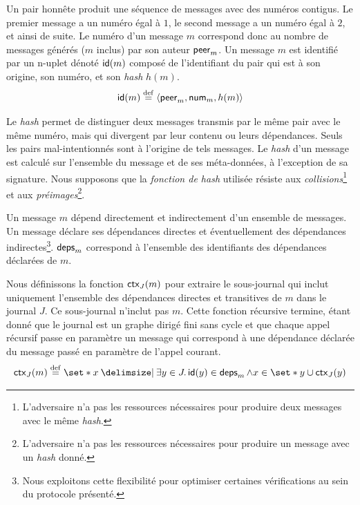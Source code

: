 Un pair honnête produit une séquence de messages avec des numéros contigus.
Le premier message a un numéro égal à $1$, le second message a un numéro égal à $2$, et ainsi de suite.
Le numéro d'un message $m$ correspond donc au nombre de messages générés ($m$ inclus) par son auteur $\trm{peer}_m$.
Un message $m$ est identifié par un n-uplet dénoté $\trm{id}(m)$ composé de l'identifiant du pair qui est à son origine, son numéro, et son \emph{hash} $h(m)$.
%
\begin{equation}
    \trm{id}(m) \defeq \tuple*{\trm{peer}_m, \trm{num}_m, h(m)}
\end{equation}

Le \emph{hash} permet de distinguer deux messages transmis par le même pair avec le même numéro, mais qui divergent par leur contenu ou leurs dépendances.
Seuls les pairs mal-intentionnés sont à l'origine de tels messages.
Le \emph{hash} d'un message est calculé sur l'ensemble du message et de ses méta-données, à l'exception de sa signature.
Nous supposons que la \emph{fonction de hash} utilisée résiste aux \emph{collisions}\footnote{L'adversaire n'a pas les ressources nécessaires pour produire deux messages avec le même \emph{hash}.} et aux \emph{préimages}\footnote{L'adversaire n'a pas les ressources nécessaires pour produire un message avec un \emph{hash} donné.}.

Un message $m$ dépend directement et indirectement d'un ensemble de messages.
Un message déclare ses dépendances directes et éventuellement des dépendances indirectes\footnote{Nous exploitons cette flexibilité pour optimiser certaines vérifications au sein du protocole présenté.}.
$\trm{deps}_m$ correspond à l'ensemble des identifiants des dépendances déclarées de $m$.

Nous définissons la fonction $\trm{ctx}_J(m)$ pour extraire le sous-journal qui inclut uniquement l'ensemble des dépendances directes et transitives de $m$ dans le journal $J$.
Ce sous-journal n'inclut pas $m$.
Cette fonction récursive termine, étant donné que le journal est un graphe dirigé fini sans cycle et que chaque appel récursif passe en paramètre un message qui correspond à une dépendance déclarée du message passé en paramètre de l'appel courant.
%
\begin{equation}
    \trm{ctx}_J(m) \defeq \set*{ x \given \exists y \in J \qsep \trm{id}(y) \in \trm{deps}_m \land x \in \set*{y} \cup \trm{ctx}_J(y)}
\end{equation}


